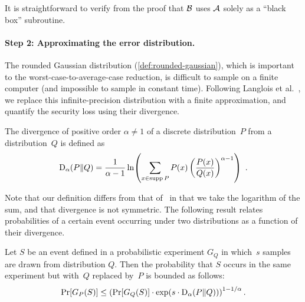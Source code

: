 \noindent It is straightforward to verify from the proof that
$\mathcal{B}$ uses $\mathcal{A}$ solely as a ``black box'' subroutine.

\paragraph{Step 2: Approximating the error distribution.}

The rounded Gaussian distribution (\autoref{def:rounded-gaussian}),
which is important to the worst-case-to-average-case reduction, is
difficult to sample on a finite computer (and impossible to sample in
constant time). Following Langlois et al.~\cite{EC:LanSteSte14}, we
replace this infinite-precision distribution with a finite
approximation, and quantify the \MOWPCA security loss using their
\renyi divergence.



\begin{definition}
  \label{def:renyi}
  The \renyi divergence of positive order $\alpha \neq 1$ of a
  discrete distribution~$P$ from a distribution~$Q$ is defined as
  \[
    \RD_\alpha(P\|Q)=\frac1{\alpha-1}\ln \parens*{
    \sum_{x\in\mathop{\mathrm{supp}} P} P(x)\left(
      \frac{P(x)}{Q(x)}\right)^{\alpha-1}} \enspace .
  \]
\end{definition}

Note that our definition differs from that of~\cite{EC:LanSteSte14} in
that we take the logarithm of the sum, and that \renyi divergence is
not symmetric.  The following result relates probabilities of a
certain event occurring under two distributions as a function of their
\renyi divergence.


\begin{lemma}%
  \label{lem:renyi}
  Let $S$ be an event defined in a probabilistic experiment $G_Q$ in
  which~$s$ samples are drawn from distribution $Q$. Then the
  probability that $S$ occurs in the same experiment but with~$Q$
  replaced by~$P$ is bounded as follows:
  \begin{equation}
    \label{eqn:renyi_loss}
    \Pr[G_P(S)] \leq \left( \Pr[G_Q(S)] \cdot \exp(s \cdot
      \mathrm{D}_\alpha(P\|Q)) \right)^{1-1/\alpha}.
  \end{equation}
\end{lemma}

